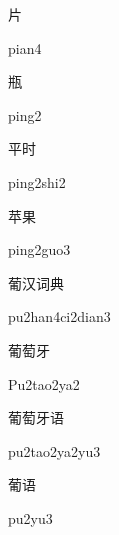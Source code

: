 \begin{multicols*}{2}
\begin{verbete}[pian4]{片}
\begin{pronuncia}{pian4}
\end{pronuncia}
\end{verbete}

\begin{verbete}[ping2]{瓶}
\begin{pronuncia}{ping2}
\end{pronuncia}
\end{verbete}

\begin{verbete}{平时}
\begin{pronuncia}{ping2shi2}
\end{pronuncia}
\end{verbete}

\begin{verbete}{苹果}
\begin{pronuncia}{ping2guo3}
\end{pronuncia}
\end{verbete}

\begin{verbete}{葡汉词典}
\begin{pronuncia}{pu2han4ci2dian3}
\end{pronuncia}
\end{verbete}

\begin{verbete}[Pu2tao2ya2]{葡萄牙}
\begin{pronuncia}{Pu2tao2ya2}
\end{pronuncia}
\end{verbete}

\begin{verbete}[pu2tao2ya2yu3]{葡萄牙语}
\begin{pronuncia}{pu2tao2ya2yu3}
\end{pronuncia}
\end{verbete}

\begin{verbete}[pu2yu3]{葡语}
\begin{pronuncia}{pu2yu3}
\end{pronuncia}
\end{verbete}


\end{multicols*}
